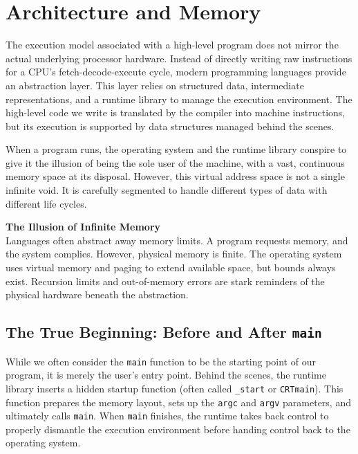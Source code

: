 \chapter{Architecture and Memory}
\label{ch:architecture_and_memory}

The execution model associated with a high-level program does not mirror the actual underlying processor hardware. Instead of directly writing raw instructions for a CPU's fetch-decode-execute cycle, modern programming languages provide an abstraction layer. This layer relies on structured data, intermediate representations, and a runtime library to manage the execution environment. The high-level code we write is translated by the compiler into machine instructions, but its execution is supported by data structures managed behind the scenes. 

When a program runs, the operating system and the runtime library conspire to give it the illusion of being the sole user of the machine, with a vast, continuous memory space at its disposal. However, this virtual address space is not a single infinite void. It is carefully segmented to handle different types of data with different life cycles.

\begin{insightbox}
\textbf{The Illusion of Infinite Memory} \\
Languages often abstract away memory limits. A program requests memory, and the system complies. However, physical memory is finite. The operating system uses virtual memory and paging to extend available space, but bounds always exist. Recursion limits and out-of-memory errors are stark reminders of the physical hardware beneath the abstraction.
\end{insightbox}

\section{The True Beginning: Before and After \texttt{main}}
While we often consider the \texttt{main} function to be the starting point of our program, it is merely the user's entry point. Behind the scenes, the runtime library inserts a hidden startup function (often called \texttt{\_start} or \texttt{CRTmain}). This function prepares the memory layout, sets up the \texttt{argc} and \texttt{argv} parameters, and ultimately calls \texttt{main}. When \texttt{main} finishes, the runtime takes back control to properly dismantle the execution environment before handing control back to the operating system.

